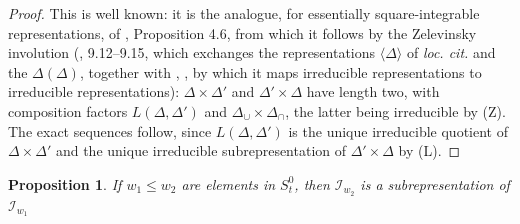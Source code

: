 \documentclass[a4paper,12pt,leqno]{amsart}
\newcommand{\caI}{\mathcal{I}}
\theoremstyle{plain}
\newtheorem{prop}[thm]{Proposition}
\theoremstyle{definition}
\theoremstyle{definition}
\begin{document}
\begin{proof}
This is well known: it is the analogue, for essentially square-integrable representations, of
\cite{Zel80}, Proposition 4.6, from which it follows by the Zelevinsky involution (\cite{Zel80},
9.12--9.15, which exchanges the representations $\langle\Delta\rangle$ of \emph{loc. cit.} and the
$\Delta(\Delta)$, together with \cite{Aub95}, \cite{MW86}, by which it maps irreducible representations
to irreducible representations): $\Delta\times\Delta'$ and $\Delta'\times\Delta$ have length two, with
composition factors $L(\Delta,\Delta')$ and $\Delta_\cup\times\Delta_\cap$, the latter being irreducible
by (Z). The exact sequences follow, since $L(\Delta,\Delta')$ is the unique irreducible quotient of
$\Delta\times\Delta'$ \cite{Rod82} and the unique irreducible subrepresentation of $\Delta'\times\Delta$
by (L).
\end{proof}


\begin{prop}\label{prop:inclusion}
 If $w_1\leq w_2$ are elements in $S_t^0$, then $\caI_{w_2}$ is a subrepresentation of $\caI_{w_1}$
 \end{prop}
\end{document}
